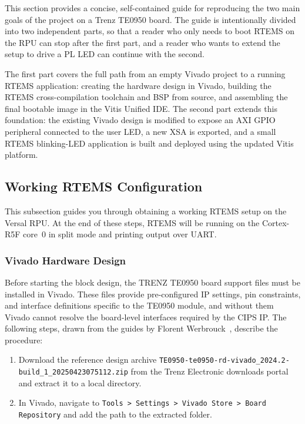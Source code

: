 \documentclass[
	a4paper,
]{CSMakotoTechnicalReport}
\begin{document}
This section provides a concise, self-contained guide for reproducing the two main goals of the project on a Trenz TE0950 board.
The guide is intentionally divided into two independent parts, so that a reader who only needs to boot RTEMS on the RPU can stop after the first part, and a reader who wants to extend the setup to drive a PL LED can continue with the second.

The first part covers the full path from an empty Vivado project to a running RTEMS application: creating the hardware design in Vivado, building the RTEMS cross-compilation toolchain and BSP from source, and assembling the final bootable image in the Vitis Unified IDE.
The second part extends this foundation: the existing Vivado design is modified to expose an AXI GPIO peripheral connected to the user LED, a new XSA is exported, and a small RTEMS blinking-LED application is built and deployed using the updated Vitis platform.


\subsection{Working RTEMS Configuration}
\label{sec:guide-working-rtems}

This subsection guides you through obtaining a working RTEMS setup on the Versal RPU.
At the end of these steps, RTEMS will be running on the Cortex-R5F core~0 in split mode and printing output over UART.

\subsubsection{Vivado Hardware Design}
\label{sec:guide-vivado-base}

Before starting the block design, the TRENZ TE0950 board support files must be installed in Vivado.
These files provide pre-configured IP settings, pin constraints, and interface definitions specific to the TE0950 module, and without them Vivado cannot resolve the board-level interfaces required by the CIPS IP.
The following steps, drawn from the guides by Florent Werbrouck~\cite{werbrouck-te0950-start,werbrouck-te0950-baremetal}, describe the procedure:

\begin{enumerate}
  \item Download the reference design archive \newline
        \texttt{TE0950-te0950-rd-vivado\_2024.2-build\_1\_20250423075112.zip}
        from the Trenz Electronic downloads portal~\cite{trenz-te0950-download} and extract it to a local directory.
  \item In Vivado, navigate to \texttt{Tools\,>\,Settings\,>\,Vivado Store\,>\,Board Repository} and add the path to the extracted folder.
\end{enumerate}
\end{document}
